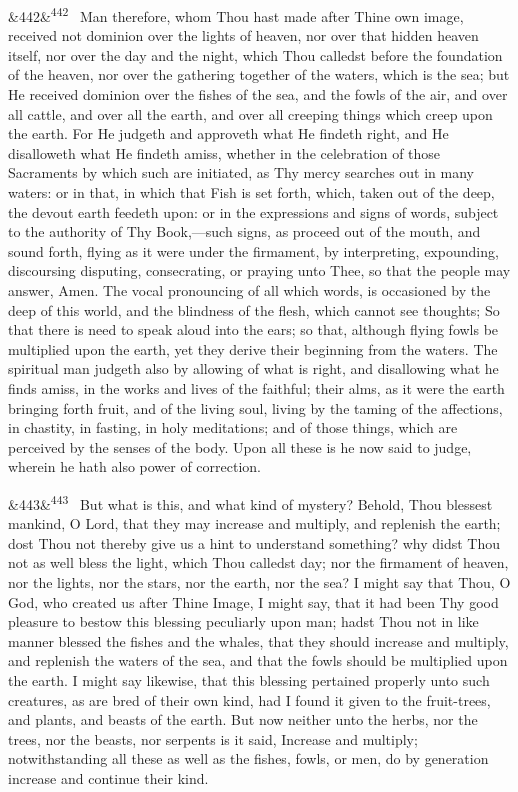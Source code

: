\documentclass[12pt]{article}
\newcommand{\para}[1][]{\par\noindent\ifx&#1&\else\textsuperscript{\footnotesize #1}~\fi}
\begin{document}
\para[442] Man therefore, whom Thou hast made after Thine own image, received not dominion over the lights of heaven, nor over that hidden heaven itself, nor over the day and the night, which Thou calledst before the foundation of the heaven, nor over the gathering together of the waters, which is the sea; but He received dominion over the fishes of the sea, and the fowls of the air, and over all cattle, and over all the earth, and over all creeping things which creep upon the earth. For He judgeth and approveth what He findeth right, and He disalloweth what He findeth amiss, whether in the celebration of those Sacraments by which such are initiated, as Thy mercy searches out in many waters: or in that, in which that Fish is set forth, which, taken out of the deep, the devout earth feedeth upon: or in the expressions and signs of words, subject to the authority of Thy Book,---such signs, as proceed out of the mouth, and sound forth, flying as it were under the firmament, by interpreting, expounding, discoursing disputing, consecrating, or praying unto Thee, so that the people may answer, Amen. The vocal pronouncing of all which words, is occasioned by the deep of this world, and the blindness of the flesh, which cannot see thoughts; So that there is need to speak aloud into the ears; so that, although flying fowls be multiplied upon the earth, yet they derive their beginning from the waters. The spiritual man judgeth also by allowing of what is right, and disallowing what he finds amiss, in the works and lives of the faithful; their alms, as it were the earth bringing forth fruit, and of the living soul, living by the taming of the affections, in chastity, in fasting, in holy meditations; and of those things, which are perceived by the senses of the body. Upon all these is he now said to judge, wherein he hath also power of correction.

\para[443] But what is this, and what kind of mystery? Behold, Thou blessest mankind, O Lord, that they may increase and multiply, and replenish the earth; dost Thou not thereby give us a hint to understand something? why didst Thou not as well bless the light, which Thou calledst day; nor the firmament of heaven, nor the lights, nor the stars, nor the earth, nor the sea? I might say that Thou, O God, who created us after Thine Image, I might say, that it had been Thy good pleasure to bestow this blessing peculiarly upon man; hadst Thou not in like manner blessed the fishes and the whales, that they should increase and multiply, and replenish the waters of the sea, and that the fowls should be multiplied upon the earth. I might say likewise, that this blessing pertained properly unto such creatures, as are bred of their own kind, had I found it given to the fruit-trees, and plants, and beasts of the earth. But now neither unto the herbs, nor the trees, nor the beasts, nor serpents is it said, Increase and multiply; notwithstanding all these as well as the fishes, fowls, or men, do by generation increase and continue their kind.
\end{document}
